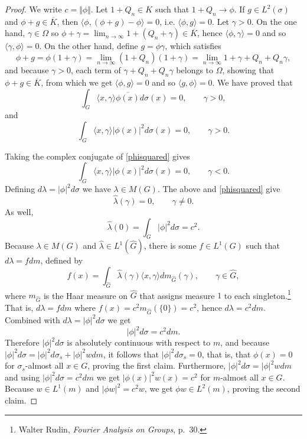 \documentclass{article}
\newcommand{\inner}[2]{\langle #1, #2 \rangle}
\newcommand{\norm}[1]{\Vert #1 \Vert}
\begin{document}
\begin{proof}
We write $c=\norm{\phi}$.
Let $1+Q_n \in K$ such that $1+Q_n \to \phi$. 
If  $g \in L^2(\sigma)$ and $\phi+ g \in \overline{K}$,
then $\inner{\phi}{(\phi+ g) - \phi}=0$, i.e. $\inner{\phi}{g}=0$.
Let $\gamma>0$. On the one hand, $\gamma \in \Omega$ so 
$\phi+\gamma = \lim_{n \to \infty} 1+(Q_n + \gamma) \in \overline{K}$, hence
$\inner{\phi}{\gamma}=0$ and so $\inner{\gamma}{\phi}=0$. On the other hand, define $g=\phi \gamma$, 
which satisfies
\[
\phi+g = \phi(1+\gamma) = \lim_{n \to \infty} (1+Q_n)(1+\gamma)=
\lim_{n \to \infty} 1+\gamma+Q_n+Q_n \gamma,
\]
and because $\gamma >0$, each term of $\gamma+Q_n + Q_n\gamma $ belongs to $\Omega$,
showing that $\phi+g \in \overline{K}$, from which we get $\inner{\phi}{g}=0$ and so $\inner{g}{\phi}=0$. We have proved that
\begin{equation}
\int_G \inner{x}{\gamma} \overline{\phi(x)}  d\sigma(x)=0, \qquad \gamma>0,
\label{phi}
\end{equation}
and
\begin{equation}
\int_G  \inner{x}{\gamma} |\phi(x)|^2  d\sigma(x)=0, \qquad \gamma>0.
\label{phisquared}
\end{equation}

Taking the complex conjugate of \eqref{phisquared} gives
\[
\int_G  \inner{x}{\gamma} |\phi(x)|^2  d\sigma(x)=0, \qquad \gamma<0.
\]
Defining $d\lambda = |\phi|^2 d\sigma$ we have $\lambda \in M(G)$.  The above and \eqref{phisquared} give 
\[
\hat{\lambda}(\gamma) = 0, \qquad \gamma \neq 0.
\]
As well,
\[
\hat{\lambda}(0) = \int_G |\phi|^2 d\sigma = c^2.
\]
Because $\lambda \in M(G)$ and $\hat{\lambda} \in L^1(\widehat{G})$, there is some $f \in L^1(G)$ such that $d\lambda = f dm$, defined by
\[
f(x) = \int_{\widehat{G}} \hat{\lambda}(\gamma) \inner{x}{\gamma} dm_{\widehat{G}}(\gamma), \qquad \gamma \in \widehat{G},
\]
where $m_{\widehat{G}}$ is the Haar measure on $\widehat{G}$ that assigns measure $1$ to each singleton.\footnote{Walter Rudin, {\em Fourier Analysis on Groups},
p.~30.}
That is, $d\lambda = fdm$ where
$f(x) = c^2 m_{\widehat{G}}(\{0\})=c^2$, hence
$d\lambda = c^2 dm$. Combined with $d\lambda = |\phi|^2 d\sigma$ we get
\[
|\phi|^2 d\sigma = c^2 dm.
\]
Therefore $|\phi|^2 d\sigma$ is absolutely continuous with respect to $m$, and because $|\phi|^2 d\sigma = |\phi|^2 d\sigma_s +
|\phi|^2 w dm$, it follows that $|\phi|^2 d\sigma_s=0$, that is, that $\phi(x)=0$ for $\sigma_s$-almost all $x \in G$, proving the first claim.
Furthermore, $|\phi|^2 d\sigma = |\phi|^2 w dm$ and using $|\phi|^2 d\sigma = c^2 dm$ we get 
$|\phi(x)|^2 w(x) = c^2$ for $m$-almost all $x \in G$. Because $w \in L^1(m)$ and $|\phi w|^2  = c^2 w$, we get
$\phi w \in L^2(m)$, proving the second claim.


\end{proof}
\end{document}
